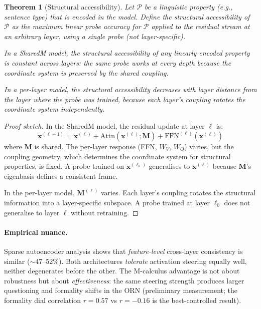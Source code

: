 \documentclass[11pt, a4paper]{article}
\newcommand{\M}{\mathbf{M}}
\newcommand{\x}{\mathbf{x}}
\theoremstyle{plain}
\newtheorem{theorem}{Theorem}
\theoremstyle{definition}
\theoremstyle{remark}
\begin{document}
\begin{theorem}[Structural accessibility]
\label{thm:accessibility}
Let $\mathcal{P}$ be a linguistic property (e.g., sentence type) that is encoded in the model.
Define the \emph{structural accessibility} of $\mathcal{P}$ as the maximum linear probe accuracy for $\mathcal{P}$ applied to the residual stream at an \emph{arbitrary} layer, using a \emph{single} probe (not layer-specific).

In a SharedM model, the structural accessibility of any linearly encoded property is \emph{constant across layers}: the same probe works at every depth because the coordinate system is preserved by the shared coupling.

In a per-layer model, the structural accessibility decreases with layer distance from the layer where the probe was trained, because each layer's coupling rotates the coordinate system independently.
\end{theorem}

\begin{proof}[Proof sketch]
In the SharedM model, the residual update at layer $\ell$ is:
\[
\x^{(\ell+1)} = \x^{(\ell)} + \text{Attn}(\x^{(\ell)}; \M) + \text{FFN}^{(\ell)}(\x^{(\ell)})
\]
where $\M$ is shared. The per-layer response (FFN, $W_V$, $W_O$) varies, but the coupling geometry, which determines the coordinate system for structural properties, is fixed. A probe trained on $\x^{(\ell_0)}$ generalises to $\x^{(\ell)}$ because $\M$'s eigenbasis defines a consistent frame.

In the per-layer model, $\M^{(\ell)}$ varies. Each layer's coupling rotates the structural information into a layer-specific subspace. A probe trained at layer $\ell_0$ does not generalise to layer $\ell$ without retraining.
\end{proof}

\paragraph{Empirical nuance.}
Sparse autoencoder analysis shows that \emph{feature-level} cross-layer consistency is similar ($\sim$47--52\%).
Both architectures \emph{tolerate} activation steering equally well, neither degenerates before the other.
The M-calculus advantage is not about robustness but about \emph{effectiveness}: the same steering strength produces larger questioning and formality shifts in the ORN (preliminary measurement; the formality dial correlation $r{=}0.57$ vs $r{=}{-}0.16$ is the best-controlled result).
\end{document}
